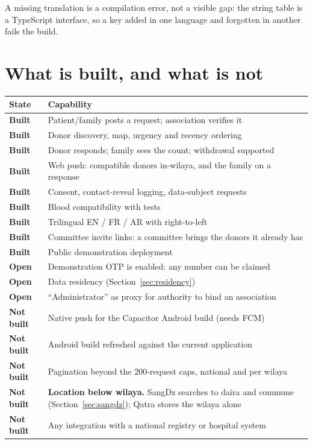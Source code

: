 \documentclass[11pt,a4paper]{article}
\newcommand{\good}{{\color{qatraGreen}\textbf{Built}}}
\newcommand{\open}{{\color{qatraAmber}\textbf{Open}}}
\newcommand{\none}{{\color{qatraRed}\textbf{Not built}}}
\begin{document}
A missing translation is a compilation error, not a visible gap: the string
table is a TypeScript interface, so a key added in one language and forgotten in
another fails the build.

\section{What is built, and what is not}\label{sec:notbuilt}

\begin{center}
\begin{tabularx}{\textwidth}{@{}lX@{}}
\toprule
\textbf{State} & \textbf{Capability} \\
\midrule
\good & Patient/family posts a request; association verifies it \\
\good & Donor discovery, map, urgency and recency ordering \\
\good & Donor responds; family sees the count; withdrawal supported \\
\good & Web push: compatible donors in-wilaya, and the family on a response \\
\good & Consent, contact-reveal logging, data-subject requests \\
\good & Blood compatibility with tests \\
\good & Trilingual EN / FR / AR with right-to-left \\
\good & Committee invite links: a committee brings the donors it already has \\
\good & Public demonstration deployment \\
\midrule
\open & Demonstration OTP is enabled: any number can be claimed \\
\open & Data residency (Section~\ref{sec:residency}) \\
\open & ``Administrator'' as proxy for authority to bind an association \\
\midrule
\none & Native push for the Capacitor Android build (needs FCM) \\
\none & Android build refreshed against the current application \\
\none & Pagination beyond the 200-request caps, national and per wilaya \\
\none & \textbf{Location below wilaya.} SangDz searches to daïra and commune
(Section~\ref{sec:sangdz}); Qatra stores the wilaya alone \\
\none & Any integration with a national registry or hospital system \\
\bottomrule
\end{tabularx}
\end{center}
\end{document}
